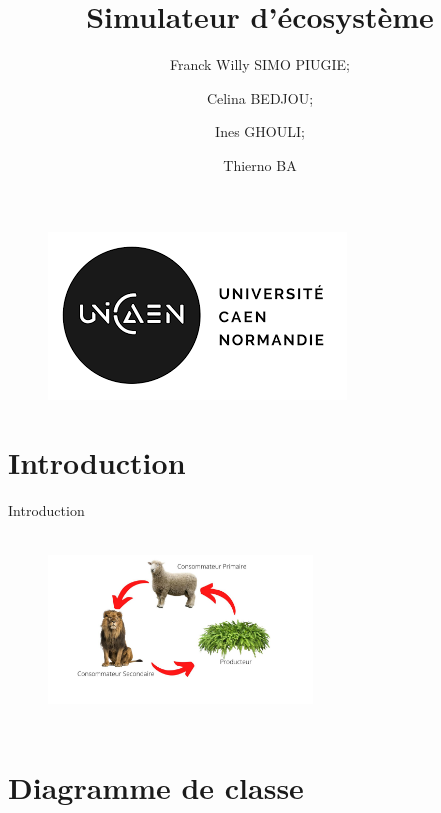 \documentclass{beamer}
\title{Simulateur d'écosystème}
\institute{Université de Caen Normandie}
\author{Franck Willy SIMO PIUGIE; \and Celina BEDJOU; \and Ines GHOULI; \and Thierno BA }
\begin{document}
\begin{frame}
    \titlepage
    \begin{figure}[htpb]
        \begin{center}
            \includegraphics[keepaspectratio, scale=0.2]{images/logo.png}
        \end{center}
    \end{figure}
\end{frame}

\begin{frame}
\tableofcontents
\end{frame}

\section{Introduction}

\begin{frame}{Introduction}
    \begin{figure}
        \centering
        \includegraphics[width=7cm, height=5cm]{images/intro.jpeg}
    \end{figure}
\end{frame}


\section{Diagramme de classe}
\end{document}
